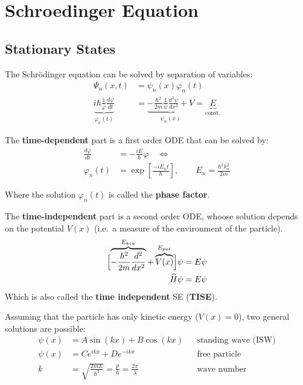 \section{Schroedinger Equation}

\subsection{Stationary States}
The Schrödinger equation can be solved by separation of variables:
\noindent\begin{align*}
    \Psi_n(x,t)                                                        & = \psi_n(x)\varphi_n(t)                                                                                         \\
    \underbrace{i\hbar\frac1\varphi\frac{d\varphi}{dt}}_{\varphi_n(t)} & =\underbrace{-\frac{\hbar^2}{2m}\frac1\psi\frac{d^2\psi}{dx^2}+V}_{\psi_n (x)} = \underbrace{E}_{\text{const.}}
\end{align*}


The \textbf{time-dependent} part is a first order ODE that can be solved by:
\noindent\begin{align*}
    \frac{d\varphi}{dt} & =-\frac{iE}{\hbar}\varphi \quad\Leftrightarrow                                 \\
    \varphi_n(t)        & =\exp\left[\frac{-iE_n t}{\hbar}\right], \qquad E_n = \frac{\hbar^2 k_n^2}{2m}
\end{align*}

Where the solution $\varphi_n(t)$ is called the \textbf{phase factor}.
\newpar{}


The \textbf{time-independent} part is a second order ODE, whoose solution depends on the potential $V(x)$ (i.e.\ a measure of the environment of the particle).
\noindent\begin{align*}
    \Bigl[\overbrace{-\frac{\hbar^2}{2m}\frac{d^2}{dx^2}}^{E_{kin}}+ \overbrace{V(x)}^{E_{pot}}\Bigr]\psi & = E\psi \\
    \widehat{H}\psi                                                                                       & = E\psi
\end{align*}
Which is also called the \textbf{time independent} SE (\textbf{TISE}).

\newpar{}
Assuming that the particle has only kinetic energy ($V(x) = 0$), two general solutions are possible:
\noindent\begin{align*}
    \psi(x) & =A\sin(kx)+B\cos(kx)                                               &  & \text{standing wave (ISW)} \\
    \psi(x) & =Ce^{ikx}+De^{-ikx}                                                &  & \text{free particle}       \\
    k       & =\sqrt{\frac{2mE}{\hbar^{2}}}=\frac{p}{\hbar}=\frac{2\pi}{\lambda} &  & \text{wave number}
\end{align*}

